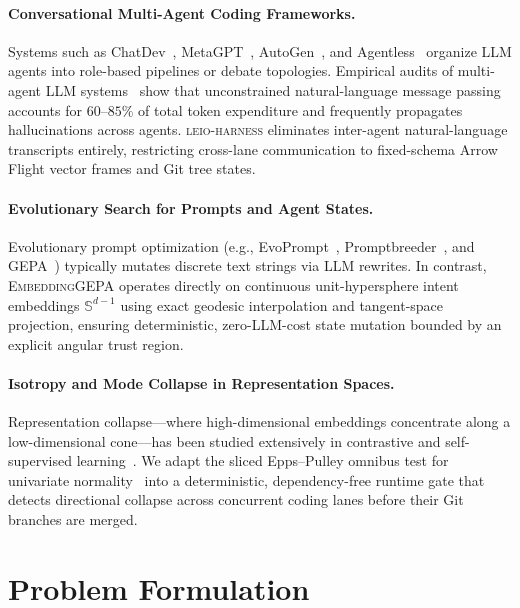 \documentclass[11pt]{article}
\begin{document}
\paragraph{Conversational Multi-Agent Coding Frameworks.}
Systems such as ChatDev~\cite{qian2024chatdev}, MetaGPT~\cite{hong2024metagpt}, AutoGen~\cite{wu2024autogen}, and Agentless~\cite{xia2024agentless} organize LLM agents into role-based pipelines or debate topologies. Empirical audits of multi-agent LLM systems~\cite{cemri2025multiagent} show that unconstrained natural-language message passing accounts for $60\text{--}85\%$ of total token expenditure and frequently propagates hallucinations across agents. \textsc{leio-harness} eliminates inter-agent natural-language transcripts entirely, restricting cross-lane communication to fixed-schema Arrow Flight vector frames and Git tree states.

\paragraph{Evolutionary Search for Prompts and Agent States.}
Evolutionary prompt optimization (e.g., EvoPrompt~\cite{guo2024evoprompt}, Promptbreeder~\cite{fernando2024promptbreeder}, and GEPA~\cite{agrawal2025gepa}) typically mutates discrete text strings via LLM rewrites. In contrast, \textsc{EmbeddingGEPA} operates directly on continuous unit-hypersphere intent embeddings $\mathbb{S}^{d-1}$ using exact geodesic interpolation and tangent-space projection, ensuring deterministic, zero-LLM-cost state mutation bounded by an explicit angular trust region.

\paragraph{Isotropy and Mode Collapse in Representation Spaces.}
Representation collapse—where high-dimensional embeddings concentrate along a low-dimensional cone—has been studied extensively in contrastive and self-supervised learning~\cite{wang2020understanding,jing2022understanding,klindt2025sigreg}. We adapt the sliced Epps--Pulley omnibus test for univariate normality~\cite{epps1983test,klindt2025sigreg} into a deterministic, dependency-free runtime gate that detects directional collapse across concurrent coding lanes before their Git branches are merged.

\section{Problem Formulation}
\end{document}
